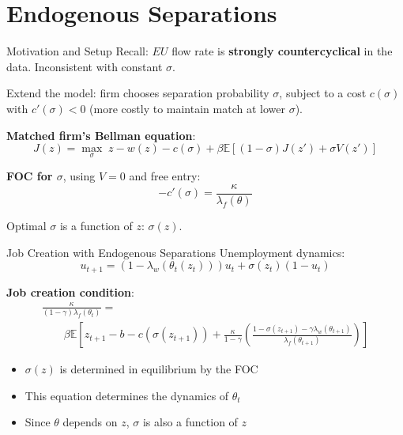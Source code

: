 \documentclass[blue]{beamer}
\newcommand{\E}{\mathbb{E}}
\begin{document}
\section{Endogenous Separations}

\begin{frame}{Motivation and Setup}
	Recall: $EU$ flow rate is \textbf{strongly countercyclical} in the data. Inconsistent with constant $\sigma$.
	
	\bigskip
	Extend the model: firm chooses separation probability $\sigma$, subject to a cost $c(\sigma)$ with $c'(\sigma) < 0$ (more costly to maintain match at lower $\sigma$).
	
	\bigskip
	\textbf{Matched firm's Bellman equation}:
	\[
	J(z) = \max_\sigma \; z - w(z) - c(\sigma) + \beta \E[(1 - \sigma) J(z') + \sigma V(z')]
	\]
	
	\bigskip
	\textbf{FOC for $\sigma$}, using $V = 0$ and free entry:
	\[
{-c'(\sigma) = \frac{\kappa}{\lambda_f(\theta)}}
	\]
	
	Optimal $\sigma$ is a function of $z$: $\sigma(z)$.
\end{frame}


\begin{frame}{Job Creation with Endogenous Separations}
	Unemployment dynamics:
	\[
	u_{t+1} = (1 - \lambda_w(\theta_t(z_t))) u_t + \sigma(z_t)(1 - u_t)
	\]
	
	\bigskip
	\textbf{Job creation condition}:
	\[
	\begin{array}{l}
	\displaystyle \frac{\kappa}{(1 - \gamma) \lambda_f(\theta_t)} =\\ 
	\quad\quad\displaystyle\beta \E\!\left[z_{t+1} - b - c(\sigma(z_{t+1})) + \frac{\kappa}{1-\gamma}\!\left(\frac{1 - \sigma(z_{t+1}) - \gamma \lambda_w(\theta_{t+1})}{\lambda_f(\theta_{t+1})}\right)\right]
	\end{array}
	\]
	
	\bigskip
	\begin{itemize}
		\item $\sigma(z)$ is determined in equilibrium by the FOC
		\item This equation determines the dynamics of $\theta_t$
		\item Since $\theta$ depends on $z$, $\sigma$ is also a function of $z$
	\end{itemize}
\end{frame}
\end{document}
